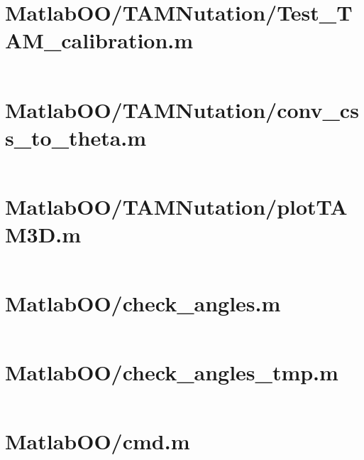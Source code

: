 \pagebreak
\section*{MatlabOO/TAMNutation/Test\_TAM\_calibration.m}\label{code:MatlabOO/TAMNutation/Test_TAM_calibration.m}
\inputminted[linenos,fontsize=\scriptsize]{matlab}{/home/dcouture/git/mathyourlife/TSatPy/beta_versions/matlab_object_oriented/TAMNutation/Test_TAM_calibration.m}

\pagebreak
\section*{MatlabOO/TAMNutation/conv\_css\_to\_theta.m}\label{code:MatlabOO/TAMNutation/conv_css_to_theta.m}
\inputminted[linenos,fontsize=\scriptsize]{matlab}{/home/dcouture/git/mathyourlife/TSatPy/beta_versions/matlab_object_oriented/TAMNutation/conv_css_to_theta.m}

\pagebreak
\section*{MatlabOO/TAMNutation/plotTAM3D.m}\label{code:MatlabOO/TAMNutation/plotTAM3D.m}
\inputminted[linenos,fontsize=\scriptsize]{matlab}{/home/dcouture/git/mathyourlife/TSatPy/beta_versions/matlab_object_oriented/TAMNutation/plotTAM3D.m}

\pagebreak
\section*{MatlabOO/check\_angles.m}\label{code:MatlabOO/check_angles.m}
\inputminted[linenos,fontsize=\scriptsize]{matlab}{/home/dcouture/git/mathyourlife/TSatPy/beta_versions/matlab_object_oriented/check_angles.m}

\pagebreak
\section*{MatlabOO/check\_angles\_tmp.m}\label{code:MatlabOO/check_angles_tmp.m}
\inputminted[linenos,fontsize=\scriptsize]{matlab}{/home/dcouture/git/mathyourlife/TSatPy/beta_versions/matlab_object_oriented/check_angles_tmp.m}

\pagebreak
\section*{MatlabOO/cmd.m}\label{code:MatlabOO/cmd.m}
\inputminted[linenos,fontsize=\scriptsize]{matlab}{/home/dcouture/git/mathyourlife/TSatPy/beta_versions/matlab_object_oriented/cmd.m}


